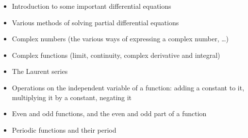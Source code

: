 {\begin{itemize}
    \end{itemize}
    \begin{itemize}
      \item Introduction to some important differential equations
      \item Various methods of solving partial differential equations
    \end{itemize}
    \begin{itemize}
      \item Complex numbers (the various ways of expressing a complex number, \dots)
      \item Complex functions (limit, continuity, complex derivative and integral)
      \item The Laurent series
    \end{itemize}
    \begin{itemize}
      \item Operations on the independent variable of a function: adding a constant to it, multiplying it by a constant, negating it
      \item Even and odd functions, and the even and odd part of a function
      \item Periodic functions and their period
    \end{itemize}
  \fi
  \clearpage}

\newcommand{\EMsheetbox}[2]{%
  \begin{minipage}[t]{0.485\linewidth}
  \begin{tcolorbox}[enhanced,sharp corners,boxrule=0.5pt,colframe=EMindigo!40!white,colback=white,
     left=6pt,right=6pt,top=4pt,bottom=4pt,before skip=0pt,after skip=0pt,
     title={#1},coltitle=EMindigo,colbacktitle=EMindigoL,fonttitle=\EMheadfont\bfseries\large,
     halign title=center]
  #2
  \end{tcolorbox}\end{minipage}}
\newcommand{\EMrows}[1]{\EMim{\renewcommand{\arraystretch}{1.1}\begin{array}{@{}r@{\;=\;}l@{}}\displaystyle #1\end{array}}}
\newcommand{\EMsheetsep}{\par\vspace{0.7em}{\color{EMline}\hrule height 0.4pt}\vspace{0.7em}\par}

